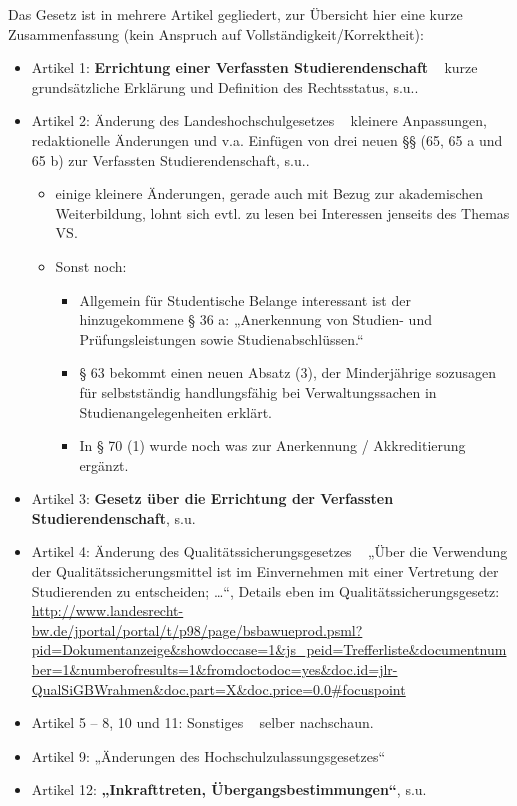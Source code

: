 \documentclass[
10pt,
a4paper,
twoside,								%
titlepage=false,							%
draft=false								%
]{scrartcl}
\begin{document}
Das Gesetz ist in mehrere Artikel gegliedert, zur Übersicht hier eine kurze Zusammenfassung (kein Anspruch auf Vollständigkeit/Korrektheit):

\begin{itemize}
	\item Artikel 1: \textbf{Errichtung einer Verfassten Studierendenschaft} \textrightarrow~ kurze grundsätzliche Erklärung und Definition des Rechtsstatus, s.u..
	\item Artikel 2: Änderung des Landeshochschulgesetzes \textrightarrow~ kleinere Anpassungen, redaktionelle Änderungen und v.a. Einfügen von drei neuen §§ (65, 65 a und 65 b) zur Verfassten Studierendenschaft, s.u..
	\begin{itemize}
		\item einige kleinere Änderungen, gerade auch mit Bezug zur akademischen Weiterbildung, lohnt sich evtl. zu lesen bei Interessen jenseits des Themas VS.
		\item Sonst noch:
		\begin{itemize}
			\item Allgemein für Studentische Belange interessant ist der hinzugekommene § 36 a: „Anerkennung von Studien- und Prüfungsleistungen sowie Studienabschlüssen.“
			\item § 63 bekommt einen neuen Absatz (3), der Minderjährige sozusagen für selbstständig handlungsfähig bei Verwaltungssachen in Studienangelegenheiten erklärt.
			\item In § 70 (1) wurde noch was zur Anerkennung / Akkreditierung ergänzt.
		\end{itemize}
	\end{itemize}
	\item Artikel 3: \textbf{Gesetz über die Errichtung der Verfassten Studierendenschaft}, s.u.
	\item Artikel 4: Änderung des Qualitätssicherungsgesetzes \textrightarrow~ „Über die Verwendung der Qualitätssicherungsmittel ist im Einvernehmen mit einer Vertretung der Studierenden zu entscheiden; …“, Details eben im Qualitätssicherungsgesetz: \sloppy \url{http://www.landesrecht-bw.de/jportal/portal/t/p98/page/bsbawueprod.psml?pid=Dokumentanzeige&showdoccase=1&js_peid=Trefferliste&documentnumber=1&numberofresults=1&fromdoctodoc=yes&doc.id=jlr-QualSiGBWrahmen&doc.part=X&doc.price=0.0#focuspoint}
	\item Artikel 5 – 8, 10 und 11: Sonstiges \textrightarrow~ selber nachschaun.
	\item Artikel 9: „Änderungen des Hochschulzulassungsgesetzes“
	\item Artikel 12: \textbf{„Inkrafttreten, Übergangsbestimmungen“}, s.u.
\end{itemize}
\end{document}
